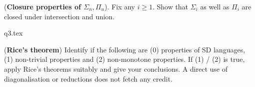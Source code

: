 \documentclass[12pt, a4paper,answers]{exam}
\begin{document}
\begin{questions}

\question[10] (\textbf{Closure properties of $\Sigma_n, \Pi_n$}). Fix any $i \ge 1$. Show that $\Sigma_i$ as well as $\Pi_i$ are closed under intersection and union.
		
	
	\begin{solution}
		{q3.tex}
	\end{solution}

	
\question [20] (\textbf{Rice's theorem}) Identify if the following are (0) properties of SD languages, (1) non-trivial properties and (2) non-monotone properties. If (1) / (2) is true, apply Rice's theorems suitably and give your conclusions. A direct use of diagonalisation or reductions does not fetch any credit.




\end{questions}
\end{document}
